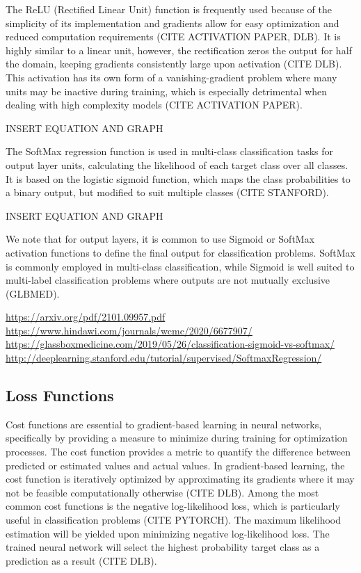 \documentclass{article}
\begin{document}
The ReLU (Rectified Linear Unit) function is frequently used because of the simplicity of its implementation and gradients allow for easy optimization and reduced computation requirements (CITE ACTIVATION PAPER, DLB). It is highly similar to a linear unit, however, the rectification zeros the output for half the domain, keeping gradients consistently large upon activation (CITE DLB). This activation has its own form of a vanishing-gradient problem where many units may be inactive during training, which is especially detrimental when dealing with high complexity models (CITE ACTIVATION PAPER). 

INSERT EQUATION AND GRAPH

The SoftMax regression function is used in multi-class classification tasks for output layer units, calculating the likelihood of each target class over all classes.  It is based on the logistic sigmoid function, which maps the class probabilities to a binary output, but modified to suit multiple classes (CITE STANFORD).

INSERT EQUATION AND GRAPH

We note that for output layers, it is common to use Sigmoid or SoftMax activation functions to define the final output for classification problems. SoftMax is commonly employed in multi-class classification, while Sigmoid is well suited to multi-label classification problems where outputs are not mutually exclusive (GLBMED).

\url{https://arxiv.org/pdf/2101.09957.pdf 	}
\url{https://www.hindawi.com/journals/wcmc/2020/6677907/}
\url{https://glassboxmedicine.com/2019/05/26/classification-sigmoid-vs-softmax/ 	}
\url{http://deeplearning.stanford.edu/tutorial/supervised/SoftmaxRegression/ }

\subsection{Loss Functions}
Cost functions are essential to gradient-based learning in neural networks, specifically by providing a measure to minimize during training for optimization processes. The cost function provides a metric to quantify the difference between predicted or estimated values and actual values. In gradient-based learning, the cost function is iteratively optimized by approximating its gradients where it may not be feasible computationally otherwise (CITE DLB). Among the most common cost functions is the negative log-likelihood loss, which is particularly useful in classification problems (CITE PYTORCH). The maximum likelihood estimation will be yielded upon minimizing negative log-likelihood loss. The trained neural network will select the highest probability target class as a prediction as a result (CITE DLB).
	
\end{document}

